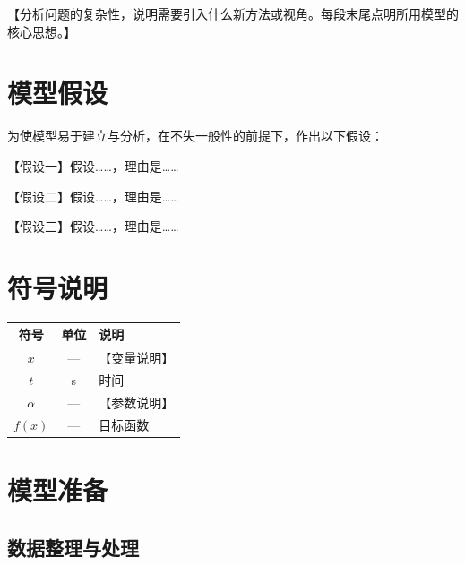 \documentclass[withoutpreface,bwprint]{cumcmthesis}
\begin{document}
【分析问题的复杂性，说明需要引入什么新方法或视角。每段末尾点明所用模型的核心思想。】

\section{模型假设}

为使模型易于建立与分析，在不失一般性的前提下，作出以下假设：

\begin{assumption}
    【假设一】假设……，理由是……
\end{assumption}

\begin{assumption}
    【假设二】假设……，理由是……
\end{assumption}

\begin{assumption}
    【假设三】假设……，理由是……
\end{assumption}

\section{符号说明}

{\renewcommand{\arraystretch}{1.38}
\setlength{\tabcolsep}{6pt}
\begin{longtable}{ccl}
    \toprule[1.5pt]
    符号       & 单位 & 说明     \\
    \midrule[1pt]
    \endfirsthead
    \endhead
    \bottomrule[1.5pt]
    \endlastfoot
    $x$      & —  & 【变量说明】 \\
    $t$      & s  & 时间     \\
    $\alpha$ & —  & 【参数说明】 \\
    $f(x)$   & —  & 目标函数   \\
\end{longtable}}

\section{模型准备}

\subsection{数据整理与处理}
\end{document}
